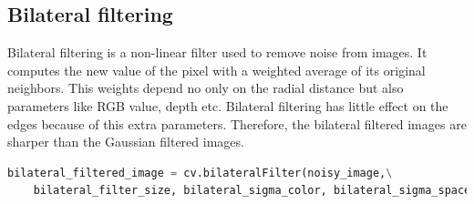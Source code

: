 \documentclass[11pt, a4paper]{article}
\begin{document}
\subsection{Bilateral filtering}
Bilateral filtering is a non-linear filter used to remove noise from images. It computes the new value of the pixel with a weighted average of its original neighbors. This weights depend no only on the radial distance but also parameters like RGB value, depth etc. Bilateral filtering has little effect on the edges because of this extra parameters. Therefore, the bilateral filtered images are sharper than the Gaussian filtered images.
\begin{lstlisting}[language=python]
bilateral_filtered_image = cv.bilateralFilter(noisy_image,\
	bilateral_filter_size, bilateral_sigma_color, bilateral_sigma_space)
\end{lstlisting}
\end{document}
